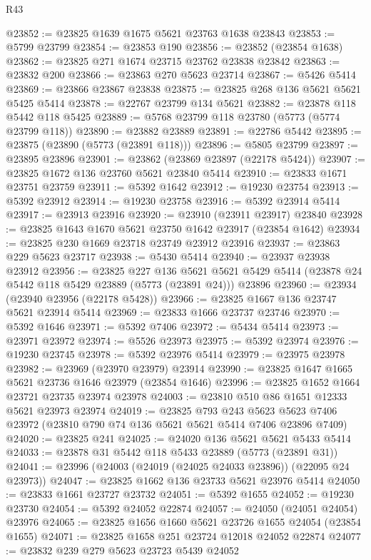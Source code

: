 \begin{lexlean}{R43}
\begin{coremodule}
@23852 := @23825 @1639 @1675 @5621 @23763 @1638 @23843
@23853 := @5799 @23799
@23854 := @23853 @190
@23856 := @23852 (@23854 @1638)
@23862 := @23825 @271 @1674 @23715 @23762 @23838 @23842
@23863 := @23832 @200
@23866 := @23863 @270 @5623 @23714
@23867 := @5426 @5414
@23869 := @23866 @23867 @23838
@23875 := @23825 @268 @136 @5621 @5621 @5425 @5414
@23878 := @22767 @23799 @134 @5621
@23882 := @23878 @118 @5442 @118 @5425
@23889 := @5768 @23799 @118 @23780 (@5773 (@5774 @23799 @118))
@23890 := @23882 @23889
@23891 := @22786 @5442
@23895 := @23875 (@23890 (@5773 (@23891 @118)))
@23896 := @5805 @23799
@23897 := @23895 @23896
@23901 := @23862 (@23869 @23897 (@22178 @5424))
@23907 := @23825 @1672 @136 @23760 @5621 @23840 @5414
@23910 := @23833 @1671 @23751 @23759
@23911 := @5392 @1642
@23912 := @19230 @23754
@23913 := @5392 @23912
@23914 := @19230 @23758
@23916 := @5392 @23914 @5414
@23917 := @23913 @23916
@23920 := @23910 (@23911 @23917) @23840
@23928 := @23825 @1643 @1670 @5621 @23750 @1642 @23917 (@23854 @1642)
@23934 := @23825 @230 @1669 @23718 @23749 @23912 @23916
@23937 := @23863 @229 @5623 @23717
@23938 := @5430 @5414
@23940 := @23937 @23938 @23912
@23956 := @23825
    @227
    @136
    @5621
    @5621
    @5429
    @5414
    (@23878 @24 @5442 @118 @5429 @23889 (@5773 (@23891 @24)))
    @23896
@23960 := @23934 (@23940 @23956 (@22178 @5428))
@23966 := @23825 @1667 @136 @23747 @5621 @23914 @5414
@23969 := @23833 @1666 @23737 @23746
@23970 := @5392 @1646
@23971 := @5392 @7406
@23972 := @5434 @5414
@23973 := @23971 @23972
@23974 := @5526 @23973
@23975 := @5392 @23974
@23976 := @19230 @23745
@23978 := @5392 @23976 @5414
@23979 := @23975 @23978
@23982 := @23969 (@23970 @23979) @23914
@23990 := @23825 @1647 @1665 @5621 @23736 @1646 @23979 (@23854 @1646)
@23996 := @23825 @1652 @1664 @23721 @23735 @23974 @23978
@24003 := @23810 @510 @86 @1651 @12333 @5621 @23973 @23974
@24019 := @23825
    @793
    @243
    @5623
    @5623
    @7406
    @23972
    (@23810 @790 @74 @136 @5621 @5621 @5414 @7406 @23896 @7409)
@24020 := @23825 @241
@24025 := @24020 @136 @5621 @5621 @5433 @5414
@24033 := @23878 @31 @5442 @118 @5433 @23889 (@5773 (@23891 @31))
@24041 := @23996 (@24003 (@24019 (@24025 @24033 @23896)) (@22095 @24 @23973))
@24047 := @23825 @1662 @136 @23733 @5621 @23976 @5414
@24050 := @23833 @1661 @23727 @23732
@24051 := @5392 @1655
@24052 := @19230 @23730
@24054 := @5392 @24052 @22874
@24057 := @24050 (@24051 @24054) @23976
@24065 := @23825 @1656 @1660 @5621 @23726 @1655 @24054 (@23854 @1655)
@24071 := @23825 @1658 @251 @23724 @12018 @24052 @22874
@24077 := @23832 @239 @279 @5623 @23723 @5439 @24052

\end{coremodule}
\end{lexlean}
